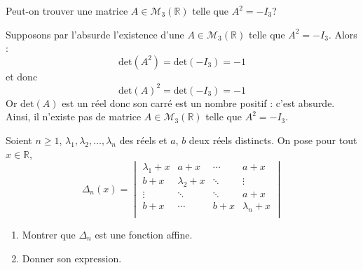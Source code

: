 \documentclass[a4paper,10pt]{report}
\begin{document}
\begin{Exa} Peut-on trouver une matrice $A \in \mathcal{M}_3(\mathbb{R})$ telle que $A^2= - I_3$?
\end{Exa}

\corr Supposons par l'absurde l'existence d'une $A \in \mathcal{M}_3(\mathbb{R})$ telle que $A^2= - I_3$. Alors :
$$ \textrm{det}(A^2) = \textrm{det}(-I_3) = - 1$$
et donc 
$$ \textrm{det}(A)^2 = \textrm{det}(-I_3) = - 1$$
Or $\textrm{det}(A)$ est un réel donc son carré est un nombre positif : c'est absurde. Ainsi, il n'existe pas de matrice $A \in \mathcal{M}_3(\mathbb{R})$ telle que $A^2= - I_3$.

\begin{Exa} Soient $n \geq 1$, $\lambda_1 ,\lambda_2 ,\ldots,\lambda_n$ des réels et $a$, $b$ deux réels distincts. On pose pour tout $x \in \mathbb{R}$,
    \[
    \Delta_n(x) =
    \begin{vmatrix}
        {\lambda_1 + x} & {a + x} & \cdots & {a + x} \\
        {b + x} & {\lambda_2 + x} & \ddots & \vdots \\
        \vdots & \ddots & \ddots & {a + x} \\
        {b + x} & \cdots & {b + x} & {\lambda_n + x} \\
    \end{vmatrix}    
    \]
    \begin{enumerate}
      \item Montrer que $\Delta_n$ est une fonction affine.
      \item Donner son expression.
    \end{enumerate}
\end{Exa}

\corr 
\end{document}

